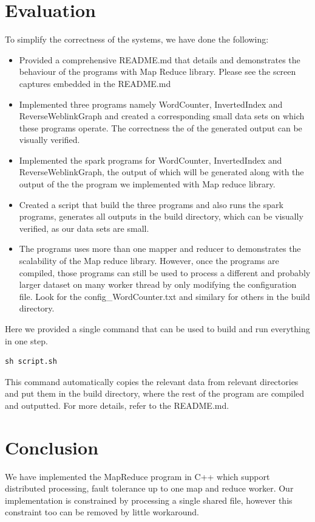 \documentclass[conference, a4paper]{IEEEtran_ID}
\begin{document}
\section{Evaluation}
To simplify the correctness of the systems, we have done the following:
\begin{itemize}
    \item Provided a comprehensive README.md that details and demonstrates the behaviour of the programs with Map Reduce library. Please see the screen captures embedded in the README.md
    \item Implemented three programs namely WordCounter, InvertedIndex and ReverseWeblinkGraph and created a corresponding small data sets on which these programs operate. The correctness the of the generated output can be visually verified.
    \item Implemented the spark programs for WordCounter, InvertedIndex and ReverseWeblinkGraph, the output of which will be generated along with the output of the the program we implemented with Map reduce library.
    \item Created a script that build the three programs and also runs the spark programs, generates all outputs in the build directory, which can be visually verified, as our data sets are small.
    \item The programs uses more than one mapper and reducer to demonstrates the scalability of the Map reduce library. However, once the programs are compiled, those programs can still be used to process a different and probably larger dataset on many worker thread by only modifying the configuration file. Look for the config\_WordCounter.txt and similary for others in the build directory.
\end{itemize}

Here we provided a single command that can be used to build and run everything in one step.
\begin{lstlisting}
sh script.sh
\end{lstlisting}
This command automatically copies the relevant data from relevant directories and put them in the build directory, where the rest of the program are compiled and outputted.
For more details, refer to the README.md.


\section{Conclusion}
We have implemented the MapReduce program in C++ which support distributed processing, fault tolerance up to one map and reduce worker. Our implementation is constrained by processing a single shared file, however this constraint too can be removed by little workaround.




\end{document}
